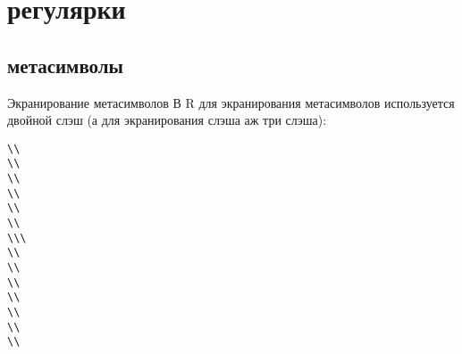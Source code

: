 \section{регулярки}
\subsection{метасимволы}
\begin{frame}[fragile]{Экранирование метасимволов}
В R для экранирования метасимволов используется двойной слэш (а для экранирования слэша аж три слэша):\\
\footnotesize
\begin{alltt}
\textbackslash\textbackslash{\color{red!13!blue}{.}}
\textbackslash\textbackslash{\color{red!13!blue}{\$}}
\textbackslash\textbackslash{\color{red!13!blue}{*}}
\textbackslash\textbackslash{\color{red!13!blue}{+}}
\textbackslash\textbackslash{\color{red!13!blue}{?}}
\textbackslash\textbackslash{\color{red!13!blue}{|}}
\textbackslash\textbackslash\textbackslash{\color{red!13!blue}{\textbackslash}}
\textbackslash\textbackslash{\color{red!13!blue}{^}}
\textbackslash\textbackslash{\color{red!13!blue}{[}}
\textbackslash\textbackslash{\color{red!13!blue}{]}}
\textbackslash\textbackslash{\color{red!13!blue}{\{}}
\textbackslash\textbackslash{\color{red!13!blue}{\}}}
\textbackslash\textbackslash{\color{red!13!blue}{(}}
\textbackslash\textbackslash{\color{red!13!blue}{)}}
\end{alltt}
\normalsize
\end{frame}
